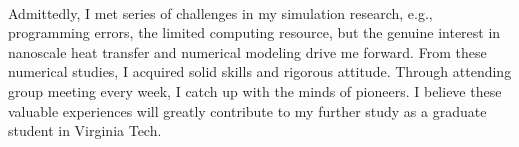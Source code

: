 \documentclass[a4paper,12pt]{article}
\begin{document}
\begin{spacing}{1.5}
\\
 Admittedly, I met series of challenges in my simulation research, e.g., programming errors, the limited computing resource, but the genuine interest in nanoscale heat transfer and numerical modeling drive me forward. From these numerical studies, I acquired solid skills and rigorous attitude. Through attending group meeting every week, I catch up with the minds of pioneers. I believe these valuable experiences will greatly contribute to my further study as a graduate student in Virginia Tech.\\
\\

\end{spacing}
\end{document}
